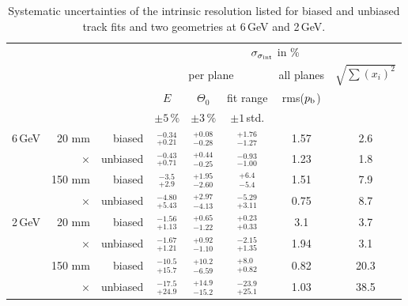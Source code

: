 \begin{table}[tbp]
 \begin{center}
  \begin{tabular}{r|r|r|c|c|c|c||c}
  \multicolumn{3}{c|}{} & \multicolumn{5}{c}{$\sigma_{\sigma_{\textrm{int}}}$ in \%}\\
  \multicolumn{3}{c|}{} & \multicolumn{3}{c|}{per plane} & all planes& $\sqrt{\sum (x_i)^2}$\\
  \multicolumn{3}{c|}{} &$E$         & $\Theta_0$      & fit range    & rms($p_{\textrm{b}}$) &  \\ 
  \multicolumn{3}{c|}{} & $\pm5\,\%$ &  $\pm 3\,\%$  & $\pm 1\,$std.&               &  \\ \hline
  6\,GeV & 20 mm   &  biased  &  ${}^{-0.34}_{+0.21}$ & ${}^{+0.08}_{-0.28}$ & ${}^{+1.76}_{-1.27}$ & 1.57 &  2.6  \\
         & ×       & unbiased &  ${}^{-0.43}_{+0.71}$ & ${}^{+0.44}_{-0.25}$ & ${}^{-0.93}_{-1.00}$ & 1.23 &  1.8  \\
	 & 150 mm  &  biased  &  ${}^{-3.5}_{+2.9}$   & ${}^{+1.95}_{-2.60}$ & ${}^{+6.4}_{-5.4}$   & 1.51 &  7.9  \\
	 & ×       & unbiased &  ${}^{-4.80}_{+5.43}$ & ${}^{+2.97}_{-4.13}$ & ${}^{-5.29}_{+3.11}$ & 0.75 &  8.7  \\ \hline
  2\,GeV & 20 mm   &  biased  &  ${}^{-1.56}_{+1.13}$ & ${}^{+0.65}_{-1.22}$ & ${}^{+0.23}_{+0.33}$ &  3.1 &  3.7  \\
         & ×       & unbiased &  ${}^{-1.67}_{+1.21}$ & ${}^{+0.92}_{-1.10}$ & ${}^{-2.15}_{+1.35}$ & 1.94 &  3.1  \\
	 & 150 mm  &  biased  &  ${}^{-10.5}_{+15.7}$ & ${}^{+10.2}_{-6.59}$ & ${}^{+8.0}_{+0.82}$  & 0.82 &  20.3 \\
	 & ×       & unbiased &  ${}^{-17.5}_{+24.9}$ & ${}^{+14.9}_{-15.2}$ & ${}^{-23.9}_{+25.1}$ & 1.03 &  38.5  \\ 
  \end{tabular}
    \caption[Systematic uncertainties]{Systematic uncertainties of the intrinsic resolution listed for biased and unbiased track fits and two geometries at 6\,GeV and 2\,GeV.}
  \label{tab:uncerts}
 \end{center}
\end{table}

